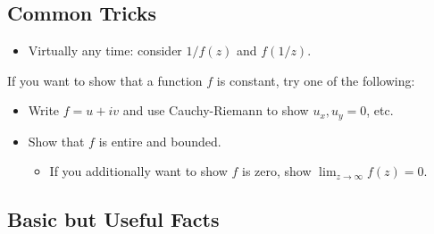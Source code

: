 \hypertarget{common-tricks}{%
\subsection{Common Tricks}\label{common-tricks}}

\begin{itemize}
\tightlist
\item
  Virtually any time: consider \(1/f(z)\) and \(f(1/z)\).
\end{itemize}

\begin{remark}

If you want to show that a function \(f\) is constant, try one of the
following:

\begin{itemize}
\tightlist
\item
  Write \(f = u + iv\) and use Cauchy-Riemann to show \(u_x, u_y = 0\),
  etc.
\item
  Show that \(f\) is entire and bounded.

  \begin{itemize}
  \tightlist
  \item
    If you additionally want to show \(f\) is zero, show
    \(\lim_{z\to\infty} f(z) = 0\).
  \end{itemize}
\end{itemize}

\end{remark}

\hypertarget{basic-but-useful-facts}{%
\subsection{Basic but Useful Facts}\label{basic-but-useful-facts}}


